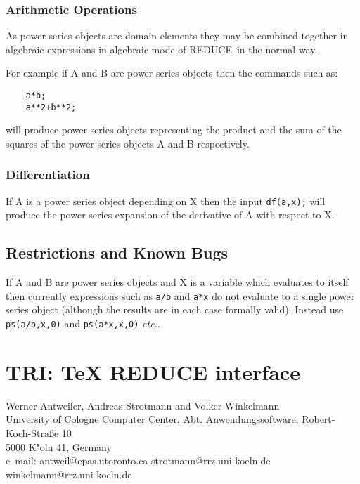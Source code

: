 \documentclass[11pt,letterpaper]{book}
\makeatletter
\newcommand{\REDUCE}{REDUCE}
\newcommand{\underscore}{\_}
\newcommand{\ttindex}[1]{{\renewcommand{\_}{\protect\underscore}%
                          \index{#1@{\tt #1}}}}
\makeatother
\begin{document}
\subsection{Arithmetic Operations}

As power series objects are domain elements they may be combined
together in algebraic expressions in algebraic mode of \REDUCE\ in the
normal way.

For example if A and B are power series objects then the commands such as:

{\small\begin{verbatim}
    a*b;
    a**2+b**2;
\end{verbatim}}

will produce power series objects representing the product and the sum
of the squares of the power series objects A and B respectively.

\subsection{Differentiation}

If A is a power series object depending on X then the input
{\tt df(a,x);} will produce the power series expansion of the derivative
of A with respect to X.


\section{Restrictions and Known Bugs}

If A and B are power series objects and X is a variable
which evaluates to itself then currently expressions such as {\tt a/b} and
{\tt a*x} do not evaluate to a single power series object (although the
results are in each case formally valid).  Instead use {\tt ps(a/b,x,0)}
and {\tt ps(a*x,x,0)} {\em etc.}.

\chapter{TRI: TeX REDUCE interface}
\label{TRI}

{\footnotesize
\begin{center}
Werner Antweiler, Andreas Strotmann and Volker Winkelmann \\
University of Cologne Computer Center,
Abt. Anwendungssoftware, Robert-Koch-Stra\ss{e} 10 \\
5000 K"oln 41, Germany \\[0.05in]
e--mail: antweil@epas.utoronto.ca strotmann@rrz.uni-koeln.de winkelmann@rrz.uni-koeln.de
\end{center}
}
\ttindex{TRI}
\end{document}
